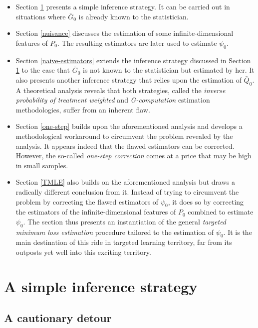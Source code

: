 \documentclass[
  11pt,
  openright,twoside]{book}
\newcommand{\Gbar}{\bar{G}}
\newcommand{\Qbar}{\bar{Q}}
\theoremstyle{definition}
\theoremstyle{definition}
\theoremstyle{definition}
\theoremstyle{definition}
\theoremstyle{remark}
\begin{document}
\begin{itemize}
\item
  Section \ref{simple-strategy} presents a simple inference strategy. It can
  be carried out in situations where \(\Gbar_{0}\) is already known to the
  statistician.
\item
  Section \ref{nuisance} discusses the estimation of some
  infinite-dimensional features of \(P_{0}\). The resulting estimators are
  later used to estimate \(\psi_{0}\).
\item
  Section \ref{naive-estimators} extends the inference strategy discussed in
  Section \ref{simple-strategy} to the case that \(\Gbar_{0}\) is not known to
  the statistician but estimated by her. It also presents another inference
  strategy that relies upon the estimation of \(\Qbar_{0}\). A theoretical
  analysis reveals that both strategies, called the \emph{inverse probability of
  treatment weighted} and \emph{G-computation} estimation methodologies, suffer
  from an inherent flaw.
\item
  Section \ref{one-step} builds upon the aforementioned analysis and develops
  a methodological workaround to circumvent the problem revealed by the
  analysis. It appears indeed that the flawed estimators can be
  corrected. However, the so-called \emph{one-step correction} comes at a price
  that may be high in small samples.
\item
  Section \ref{TMLE} also builds on the aforementioned analysis but draws a
  radically different conclusion from it. Instead of trying to circumvent the
  problem by correcting the flawed estimators of \(\psi_{0}\), it does so by
  correcting the estimators of the infinite-dimensional features of \(P_{0}\)
  combined to estimate \(\psi_{0}\). The section thus presents an instantiation
  of the general \emph{targeted minimum loss estimation} procedure tailored to the
  estimation of \(\psi_{0}\). It is the main destination of this ride in
  targeted learning territory, far from its outposts yet well into this
  exciting territory.
\end{itemize}

\hypertarget{simple-strategy}{%
\chapter{A simple inference strategy}\label{simple-strategy}}

\hypertarget{a-cautionary-detour}{%
\section{A cautionary detour}\label{a-cautionary-detour}}
\end{document}
